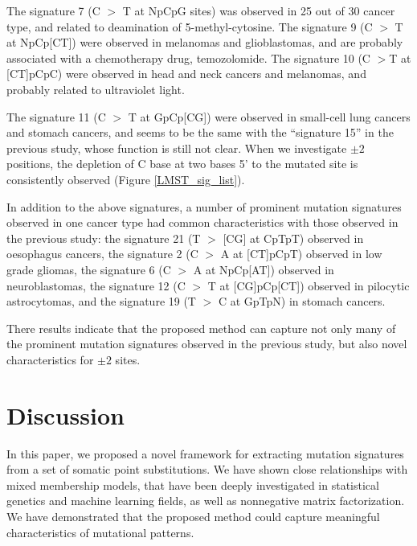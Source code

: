 The signature 7 (C $>$ T at NpCpG sites) was observed in 25 out of 30 cancer type, and related to deamination of 5-methyl-cytosine.
The signature 9 (C $>$ T at NpCp[CT]) were observed in melanomas and glioblastomas, 
and are probably associated with a chemotherapy drug, temozolomide.
The signature 10 (C $>$T at [CT]pCpC) were observed in head and neck cancers and melanomas, and probably related to ultraviolet light.


The signature 11 (C $>$ T at GpCp[CG]) were observed in small-cell lung cancers and stomach cancers,
and seems to be the same with the ``signature 15'' in the previous study, whose function is still not clear.
When we investigate $\pm 2$ positions, the depletion of C base at two bases 5' to the mutated site is consistently observed (Figure \ref{LMST_sig_list}).







In addition to the above signatures, a number of prominent mutation signatures observed in one cancer type 
had common characteristics with those observed in the previous study:
the signature 21 (T $>$ [CG] at CpTpT) observed in oesophagus cancers, 
the signature 2 (C $>$ A at [CT]pCpT) observed in low grade gliomas,
the signature 6 (C $>$ A at NpCp[AT]) observed in neuroblastomas,
the signature 12 (C $>$ T at [CG]pCp[CT]) observed in pilocytic astrocytomas, 
and the signature 19 (T $>$ C at GpTpN) in stomach cancers.



There results indicate that the proposed method can capture not only many of the prominent mutation signatures observed in the previous study,
but also novel characteristics for $\pm 2$ sites.




\section*{Discussion}


In this paper, we proposed a novel framework for extracting mutation signatures from a set of somatic point substitutions.
We have shown close relationships with mixed membership models, 
that have been deeply investigated in statistical genetics and machine learning fields, as well as nonnegative matrix factorization.
We have demonstrated that the proposed method could capture meaningful characteristics of mutational patterns.

